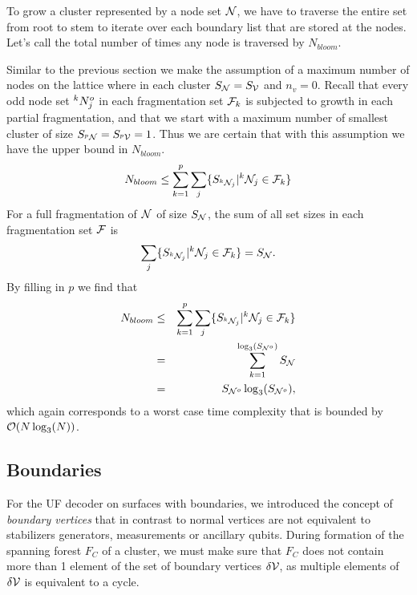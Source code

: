 To grow a cluster represented by a node set $\mathcal{N}$, we have to traverse the entire set from root to stem to iterate over each boundary list that are stored at the nodes. Let's call the total number of times any node is traversed by  $N_{bloom}$.

Similar to the previous section we make the assumption of a maximum number of nodes on the lattice where in each cluster $S_{\mathcal{N}} = S_{\mathcal{V}}$ and $n_v = 0$. Recall that every odd node set ${}^{k}N^o_j$ in each fragmentation set $\mathcal{F}_k$ is subjected to growth in each partial fragmentation, and that we start with a maximum number of smallest cluster of size $S_{{}^{p}\mathcal{N}} = S_{{}^{p}\mathcal{V}} = 1$. Thus we are certain that with this assumption we have the upper bound in $N_{bloom}$.
\begin{equation}\label{eq:nnode}
  N_{bloom} \leq \sum^{p}_{k=1}\sum_j \{ S_{{}^{k}\mathcal{N}_j} | {}^{k}\mathcal{N}_j \in \mathcal{F}_k \}
\end{equation}
For a full fragmentation of $\mathcal{N}$ of size $S_{\mathcal{N}}$, the sum of all set sizes in each fragmentation set $\mathcal{F}$ is
\begin{equation}\label{eq:sumsetsfrag}
  \sum_j \{S_{{}^{k}\mathcal{N}_j} | {}^{k}\mathcal{N}_j \in \mathcal{F}_k \} = S_{\mathcal{N}}.
\end{equation}
By filling in $p$ we find that
\begin{eqnarray}
  \nonumber N_{bloom} &\leq& \sum^{p}_{k=1}\sum_j \{ S_{{}^{k}\mathcal{N}_j} | {}^{k}\mathcal{N}_j \in \mathcal{F}_k \} \\
  \nonumber &=& \sum_{k=1}^{\log_3(S_{\mathcal{N}^o})} S_{\mathcal{N}} \\
   &=& S_{\mathcal{N}^o}\log_3(S_{\mathcal{N}^o}),
\end{eqnarray}
which again corresponds to a worst case time complexity that is bounded by $\mathcal{O}(N\log_3(N))$.

\subsection{Boundaries}
For the UF decoder on surfaces with boundaries, we introduced the concept of \emph{boundary vertices} that in contrast to normal vertices are not equivalent to stabilizers generators, measurements or ancillary qubits. During formation of the spanning forest $F_C$ of a cluster, we must make sure that $F_C$ does not contain more than 1 element of the set of boundary vertices $\delta\mathcal{V}$, as multiple elements of $\delta\mathcal{V}$ is equivalent to a cycle.

